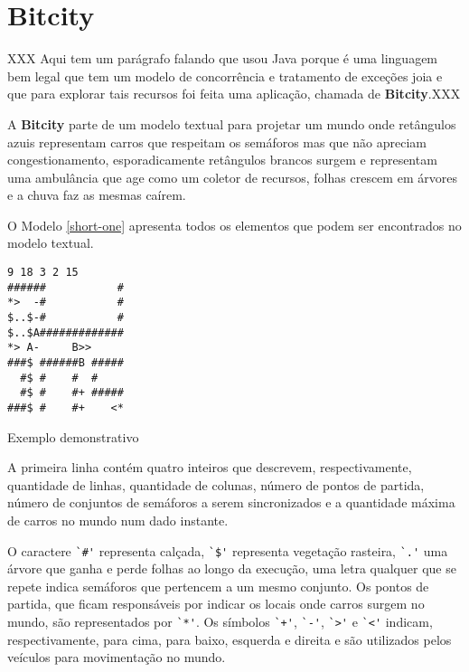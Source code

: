\chapter{Bitcity}

XXX Aqui tem um parágrafo falando que usou Java porque é uma linguagem
bem legal que tem um modelo de concorrência e tratamento de exceções
joia e que para explorar tais recursos foi feita uma aplicação,
chamada de \textbf{Bitcity}.XXX

A \textbf{Bitcity} parte de um modelo textual para projetar um mundo
onde retângulos azuis representam carros que respeitam os semáforos
mas que não apreciam congestionamento, esporadicamente
retângulos brancos surgem e representam uma ambulância que age como um
coletor de recursos, folhas crescem em árvores e a chuva faz as mesmas
caírem.

O Modelo \ref{short-one} apresenta todos os elementos que podem ser
encontrados no modelo textual.

\begin{model}
\begin{verbatim}
9 18 3 2 15
######           #
*>  -#           #
$..$-#           # 
$..$A#############
*> A-     B>>
###$ ######B #####
  #$ #    #  #    
  #$ #    #+ #####
###$ #    #+    <*
\end{verbatim}
  \caption{Exemplo demonstrativo \label{short-one}}
\end{model}

A primeira linha contém quatro inteiros que descrevem, respectivamente,
quantidade de linhas, quantidade de colunas, número de pontos de
partida, número de conjuntos de semáforos a serem sincronizados e a
quantidade máxima de carros no mundo num dado instante.

O caractere \verb!`#'! representa calçada, \verb!`$'! representa
vegetação rasteira, \verb!`.'! uma árvore que ganha e perde folhas ao
longo da execução, uma letra qualquer que se repete indica semáforos
que pertencem a um mesmo conjunto. Os pontos de partida, que ficam
responsáveis por indicar os locais onde carros surgem no mundo, são
representados por \verb!`*'!. Os símbolos \verb!`+'!, \verb!`-'!,
\verb!`>'! e \verb!`<'! indicam, respectivamente, para cima, para
baixo, esquerda e direita e são utilizados pelos veículos para
movimentação no mundo.

